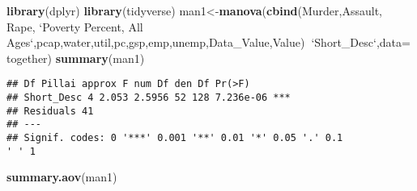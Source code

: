 \documentclass[]{article}
\newenvironment{Shaded}{\begin{snugshade}}{\end{snugshade}}
\newcommand{\DataTypeTok}[1]{\textcolor[rgb]{0.13,0.29,0.53}{#1}}
\newcommand{\KeywordTok}[1]{\textcolor[rgb]{0.13,0.29,0.53}{\textbf{#1}}}
\newcommand{\NormalTok}[1]{#1}
\newcommand{\OperatorTok}[1]{\textcolor[rgb]{0.81,0.36,0.00}{\textbf{#1}}}
\newcommand{\StringTok}[1]{\textcolor[rgb]{0.31,0.60,0.02}{#1}}
\begin{document}
\begin{Shaded}
\begin{Highlighting}[]
\KeywordTok{library}\NormalTok{(dplyr)}
\KeywordTok{library}\NormalTok{(tidyverse)}
\NormalTok{man1<-}\KeywordTok{manova}\NormalTok{(}\KeywordTok{cbind}\NormalTok{(Murder,Assault, Rape, }\StringTok{`}\DataTypeTok{Poverty Percent, All Ages}\StringTok{`}\NormalTok{,pcap,water,util,pc,gsp,emp,unemp,Data_Value,Value)}\OperatorTok{~}\StringTok{`}\DataTypeTok{Short_Desc}\StringTok{`}\NormalTok{,}\DataTypeTok{data=}\NormalTok{together)}
\KeywordTok{summary}\NormalTok{(man1)}
\end{Highlighting}
\end{Shaded}

\begin{verbatim}
## Df Pillai approx F num Df den Df Pr(>F)
## Short_Desc 4 2.053 2.5956 52 128 7.236e-06 ***
## Residuals 41
## ---
## Signif. codes: 0 '***' 0.001 '**' 0.01 '*' 0.05 '.' 0.1
' ' 1
\end{verbatim}

\begin{Shaded}
\begin{Highlighting}[]
\KeywordTok{summary.aov}\NormalTok{(man1)}
\end{Highlighting}
\end{Shaded}
\end{document}
